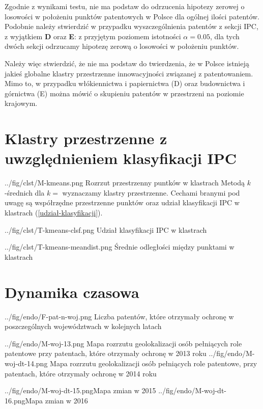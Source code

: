 Zgodnie z wynikami testu, nie ma podstaw do odrzucenia hipotezy zerowej
o losowości w położeniu punktów patentowych w Polsce dla ogólnej ilości patentów.
Podobnie należy stwierdzić w przypadku wyszczególnienia patentów z sekcji \ac{IPC},
z wyjątkiem \textbf{D} oraz \textbf{E}: z przyjętym poziomem istotności $\alpha=0.05$,
dla tych dwóch sekcji odrzucamy hipotezę zerową o losowości w położeniu punktów.

Należy więc stwierdzić, że nie ma podstaw do twierdzenia, że w Polsce istnieją
jakieś globalne klastry przestrzenne innowacyjności związanej z patentowaniem.
Mimo to, w przypadku włókiennictwa i papiernictwa (D) oraz 
budownictwa i górnictwa (E) można mówić o skupieniu patentów w przestrzeni
na poziomie krajowym.




    \newpage\section
  {Klastry przestrzenne z uwzględnieniem klasyfikacji \ac{IPC}}

  \figside
{../fig/clst/M-kmeans.png}
{Rozrzut przestrzenny puntków w klastrach}
{
Metodą $k$-średnich dla $k=$ wyznaczamy klastry przestrzenne. 
Cechami branymi pod uwagę są współrzędne przestrzenne punktów oraz
udział klasyfikacji \ac{IPC} w klastrach (\cref{udział-klasyfikacji}).
}

\tblside
{../fig/clst/T-kmeans-clsf.png}
{Udział klasyfikacji \ac{IPC} w klastrach}

\tblside
{../fig/clst/T-kmeans-meandist.png}
{Średnie odległości między punktami w klastrach}




    \newpage\section{Dynamika czasowa}

  \figside
{../fig/endo/F-pat-n-woj.png}
{ Liczba patentów, które otrzymały ochronę w poszczególnych województwach 
  w kolejnych latach }

  \figsides
{../fig/endo/M-woj-13.png}
{ Mapa rozrzutu geolokalizacji osób pełniących role patentowe 
  przy patentach, które otrzymały ochronę w 2013 roku}
{../fig/endo/M-woj-dt-14.png}
{ Mapa rozrzutu geolokalizacji osób pełniących role patentowe, 
  przy patentach, które otrzymały ochronę w 2014 roku}

  \newpage\figsides
{../fig/endo/M-woj-dt-15.png}{Mapa zmian w 2015}
{../fig/endo/M-woj-dt-16.png}{Mapa zmian w 2016}

